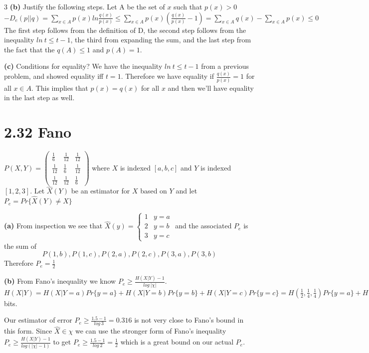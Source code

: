 \documentclass[10pt]{article}
\begin{document}
\begin{tiny}
\begin{multicols}{3}
\textbf{(b)} Justify the following steps. 
Let A be the set of $x$ such that $p(x) > 0$
\(
-D_e(p||q)=\sum_{x\in A} p(x) ln \frac{q(x)}{p(x)}
\leq \sum_{x\in A} p(x)\left( \frac{q(x)}{p(x)}-1\right)
=\sum_{x\in A} q(x) - \sum_{x\in A} p(x)
\leq 0
\)
The first step follows from the definition of D, the second step follows from the inequality $ln\ t \leq t - 1$, the third from expanding the sum, and the last step from the fact that the $q(A) \leq 1$ and $p(A)=1$.
				
\textbf{(c)} Conditions for equality?
We have the inequality $ln\ t \leq t-1$ from a previous problem, and showed equality iff $t=1$. Therefore we have equality if $\frac{q(x)}{p(x)}=1$ for all $x\in A$. This implies that $p(x)=q(x)$ for all $x$ and then we'll have equality in the last step as well. 	
          
\section*{2.32 Fano}
\(P(X,Y) = \left( \begin{array}{ccc}
\frac{1}{6} & \frac{1}{12} & \frac{1}{12} \\
\frac{1}{12} & \frac{1}{6} & \frac{1}{12} \\
\frac{1}{12} & \frac{1}{12} & \frac{1}{6} \end{array} \right)\)
 where $X$ is indexed $[a,b,c]$ and $Y$ is indexed $[1,2,3]$. Let $\hat{X}(Y)$  be an estimator for $X$ based on $Y$ and let $P_e=Pr\{\hat{X}(Y)\neq X\}$

\textbf{(a)}
From inspection we see that 
\(\hat{X}(y)=\left\{ \begin{array}{cc}
1 & y=a\\
2 & y=b\\
3 & y=c \end{array}\right. \)
and the associated $P_e$ is the sum of 
\[
P(1,b),  P(1,c), P(2,a),
P(2,c), P(3,a), P(3,b) \] Therefore $P_e=\frac{1}{2}$

\textbf{(b)}
From Fano's inequality we know \(P_e \geq \frac{H(X|Y)-1}{log\ |\chi|}\). \(
H(X|Y)= H(X|Y=a)Pr\{y=a\}+H(X|Y=b)Pr\{y=b\}+H(X|Y=c)Pr\{y=c\}
=H\left(\frac{1}{2},\frac{1}{4},\frac{1}{4}\right)Pr\{y=a\}+H\left(\frac{1}{2},\frac{1}{4},\frac{1}{4}\right)Pr\{y=b\}+H\left(\frac{1}{2},\frac{1}{4},\frac{1}{4}\right)Pr\{y=c\}
=H\left(\frac{1}{2},\frac{1}{4},\frac{1}{4}\right)\left( Pr\{y=a\}+Pr\{y=b\}+Pr\{y=c\}\right)
=H\left(\frac{1}{2},\frac{1}{4},\frac{1}{4}\right)
=1.5 \) bits. 

Our estimator of error $P_e\geq \frac{1.5-1}{log\ 3}=0.316$ is not very close to Fano's bound in this form. Since $\hat{X}\in \chi$ we can use the stronger form of Fano's inequality 
\( P_e \geq \frac{H(X|Y)-1}{log(|\chi|-1)}  \) to get \( P_e \geq \frac{1.5-1}{log\ 2}=\frac{1}{2} \) which is a great bound on our actual $P_e$.


\end{multicols}
\end{tiny}
\end{document}
